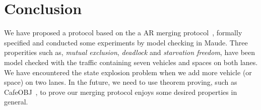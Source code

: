\documentclass[10pt, conference, compsocconf]{IEEEtran}
\begin{document}
 








\section{Conclusion}
\label{concl_sect}

We have proposed a protocol based on the a AR merging protocol~\cite{10.1145/3055004.3055028}, 
formally specified and conducted some experiments by model checking in Maude.
Three properities such as, \textit{mutual exclusion}, \textit{deadlock} 
and \textit{starvation freedom}, have been model checked with the traffic 
containing seven vehicles and spaces on both lanes.
We have encountered the state explosion problem when we add more vehicle (or space) on two lanes.
In the future, we need to use theorem proving, such as CafeOBJ~\cite{DiaconescuF98}, 
to prove our merging protocol enjoys some desired properties in general.


%
%



%
%
\end{document}
